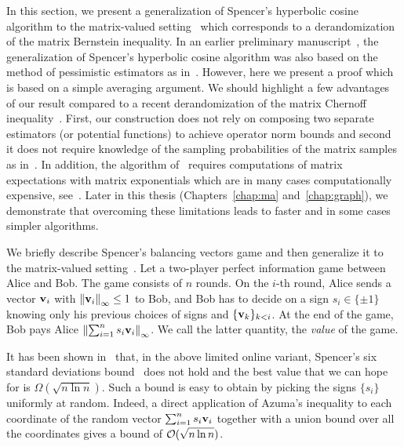 %
In this section, we present a generalization of Spencer's hyperbolic cosine algorithm to the matrix-valued setting~\cite{hyperbolic_cosine:Spencer} which corresponds to a derandomization of the matrix Bernstein inequality. In an earlier preliminary manuscript~\cite{matrix:hypercosine_zouzias}, the generalization of Spencer's hyperbolic cosine algorithm was also based on the method of pessimistic estimators as in~\cite{chernoff:matrix_valued:derand:WX08}. However, here we present a proof which is based on a simple averaging argument. We should highlight a few advantages of our result compared to a recent derandomization of the matrix Chernoff inequality~\cite{chernoff:matrix_valued:derand:WX08}. First, our construction does not rely on composing two separate estimators (or potential functions) to achieve operator norm bounds and second it does not require knowledge of the sampling probabilities of the matrix samples as in~\cite{chernoff:matrix_valued:derand:WX08}. In addition, the algorithm of~\cite{chernoff:matrix_valued:derand:WX08} requires computations of matrix expectations with matrix exponentials which are in many cases computationally expensive, see~\cite[Footnote~$6$, p. $63$]{chernoff:matrix_valued:derand:WX08}. Later in this thesis (Chapters~\ref{chap:ma} and~\ref{chap:graph}), we demonstrate that overcoming these limitations leads to faster and in some cases simpler algorithms.
%

%
We briefly describe Spencer's balancing vectors game and then generalize it to the matrix-valued setting~\cite[Lecture~$4$]{book:probmeth:Spencer}. Let a two-player perfect information game between Alice and Bob. The game consists of $n$ rounds. On the $i$-th round, Alice sends a vector ${\mathbf v}_i$ with $\left\|{\mathbf v}_i\right\|_\infty\leq 1$ to Bob, and Bob has to decide on a sign $s_i\in{\{\pm 1\}}$ knowing only his previous choices of signs and $\{{\mathbf v}_{k}\}_{k < i}$.
At the end of the game, Bob pays Alice $\left\|\sum_{i=1}^{n} s_i {\mathbf v}_i\right\|_\infty$. We call the latter quantity, the \emph{value} of the game.
%
%

%
%
It has been shown in~\cite{Spencer:balanc_vct} that, in the above limited online variant, Spencer's six standard deviations bound~\cite{sixDeviation:Spencer} does not hold and the best value that we can hope for is $\Omega(\sqrt{n \ln n})$. Such a bound is easy to obtain by picking the signs $\{s_i\}$ uniformly at random. Indeed, a direct application of Azuma's inequality to each coordinate of the random vector $\sum_{i=1}^{n} s_i {\mathbf v}_i$ together with a union bound over all the coordinates gives a bound of $\mathcal{O}(\sqrt{n\ln n})$.
%

